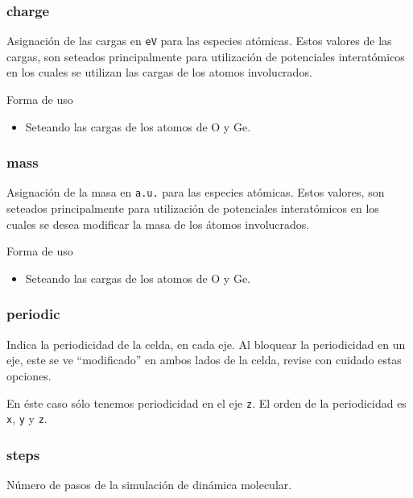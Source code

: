 \subsubsection{charge}

Asignaci\'on de las cargas en \verb|eV| para las especies at\'omicas. Estos
valores de las cargas, son seteados principalmente para utilizaci\'on de
potenciales interat\'omicos en los cuales se utilizan las cargas de los atomos
involucrados.

Forma de uso

\begin{itemize}
 \item Seteando las cargas de los atomos de O y Ge.
\end{itemize}

\subsubsection{mass}

Asignaci\'on de la masa en \verb|a.u.| para las especies at\'omicas. Estos
valores, son seteados principalmente para utilizaci\'on de potenciales
interat\'omicos en los cuales se desea modificar la masa de los \'atomos
involucrados.


Forma de uso

\begin{itemize}
 \item Seteando las cargas de los atomos de O y Ge.
\end{itemize}


\subsubsection{periodic}

Indica la periodicidad de la celda, en cada eje. Al bloquear la periodicidad en
un eje, este se ve ``modificado'' en ambos lados de la celda, revise con cuidado
estas opciones.


En \'este caso s\'olo tenemos periodicidad en el eje \verb|z|. El orden de la
periodicidad es \verb|x|, \verb|y| y \verb|z|.

\subsubsection{steps}
N\'umero de pasos de la simulaci\'on de din\'amica molecular.


